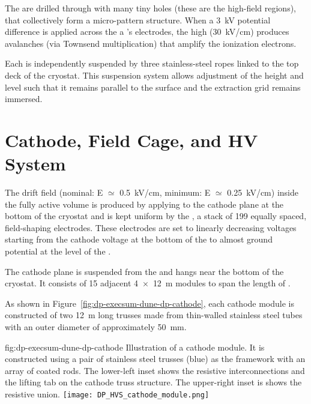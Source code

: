 The  are drilled through with many tiny holes (these are the high-field regions), that collectively form a micro-pattern structure. When a \SI{3}{kV} potential difference is applied across the a 's electrodes, the high \efield (\SI{30}{kV/cm}) produces avalanches (via Townsend multiplication) that amplify the ionization electrons.  


Each  is independently suspended by three stainless-steel ropes linked to the top deck of the cryostat. This suspension system allows adjustment of the  height and level such that it remains parallel to the  surface and the extraction grid remains immersed.   

\section{Cathode, Field Cage, and HV System}
\label{sec:dp-execsum-cathode}

The drift field (nominal: E ${\simeq}$ \SI{0.5}{kV/cm}, minimum: E ${\simeq}$ \SI{0.25}{kV/cm}) inside the fully active  volume is produced by applying  to the cathode plane at the bottom of the cryostat and is kept uniform by the , a stack of \num{199} equally spaced, field-shaping electrodes. 
These electrodes are set to linearly decreasing voltages starting from the cathode voltage at the bottom of the  to almost ground potential at the level of the . 


The cathode plane  is suspended from the  and hangs near the  bottom of the cryostat. It consists of 15 adjacent \SI{4x12}{m} 
modules to span the \dptpclen length of . 

As shown in  Figure~\ref{fig:dp-execsum-dune-dp-cathode}, each cathode module is constructed of two \SI{12}{m} long trusses made from thin-walled stainless steel tubes with an  outer diameter of approximately \SI{50}{mm}. 


\begin{dunefigure}{fig:dp-execsum-dune-dp-cathode}
{Illustration of a  cathode module.  It is constructed using a pair of stainless steel trusses (blue) as the framework with an array of coated  rods. 
The lower-left inset shows the resistive interconnections and the lifting tab on the cathode truss structure. The upper-right inset is shows the resistive union.}
\texttt{[image: DP\_HVS\_cathode\_module.png]}
\end{dunefigure}

